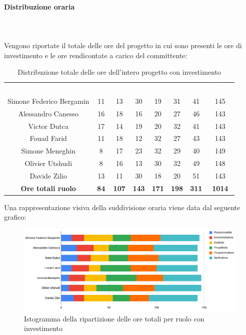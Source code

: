 \paragraph{Distribuzione oraria} \mbox{} \\ \mbox{} \\
Vengono riportate il totale delle ore del progetto in cui sono presenti le ore di investimento e le
ore rendicontate a carico del committente:

\begin{table}[H]
\centering\renewcommand{\arraystretch}{1.5}
\caption{Distribuzione totale delle ore dell'intero progetto con investimento}
\vspace{0.2cm}
\begin{tabular}{ c | c | c | c | c | c | c | c }
\rowcolor{redafk}
\textcolor{white}{\textbf{Nominativo}} & \textcolor{white}{\textbf{Re}} & 
\textcolor{white}{\textbf{Am}} & \textcolor{white}{\textbf{An}} &
\textcolor{white}{\textbf{Pt}} & \textcolor{white}{\textbf{Pm}} &
\textcolor{white}{\textbf{Ve}} & \textcolor{white}{\textbf{Totale}} \\
Simone Federico Bergamin 	& 11 	& 13 	& 30 	& 19 	& 31 	& 41 	& 145 \\
Alessandro Canesso 			& 16 	& 18 	& 16 	& 20 	& 27 	& 46 	& 143 \\
Victor Dutca 				& 17	& 14 	& 19 	& 20 	& 32 	& 41 	& 143 \\
Fouad Farid					& 11	& 18 	& 12 	& 32 	& 27 	& 43 	& 143 \\
Simone Meneghin 			& 8 	& 17 	& 23 	& 32 	& 29 	& 40 	& 149 \\
Olivier Utshudi 			& 8 	& 16 	& 13 	& 30 	& 32 	& 49 	& 148 \\
Davide Zilio 				& 13 	& 11 	& 30 	& 18 	& 20 	& 51 	& 143 \\
\rowcolor{lastrowcolor}
\textbf{Ore totali ruolo} & \textbf{84} & \textbf{107} & \textbf{143} & \textbf{171} & \textbf{198} & \textbf{311} & \textbf{1014} \\
\end{tabular}
\end{table}

Una rappresentazione visiva della suddivisione oraria viene data dal seguente grafico:
\begin{figure}[H]
\centering
\includegraphics[scale=0.60]{img/grafici/tabella_tot_con_analisi.png}
\caption{Istogramma della ripartizione delle ore totali per ruolo con investimento}
\end{figure}

